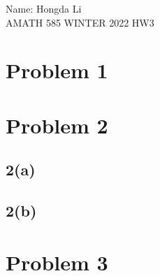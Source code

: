 \documentclass[]{article}
\begin{document}
\begin{center}
    Name: Hongda Li 
    \\
    AMATH 585 WINTER 2022 HW3
\end{center}
\section*{Problem 1}
\section*{Problem 2}
    \subsection*{2(a)}
        
    \subsection*{2(b)}

\section*{Problem 3}
\end{document}
